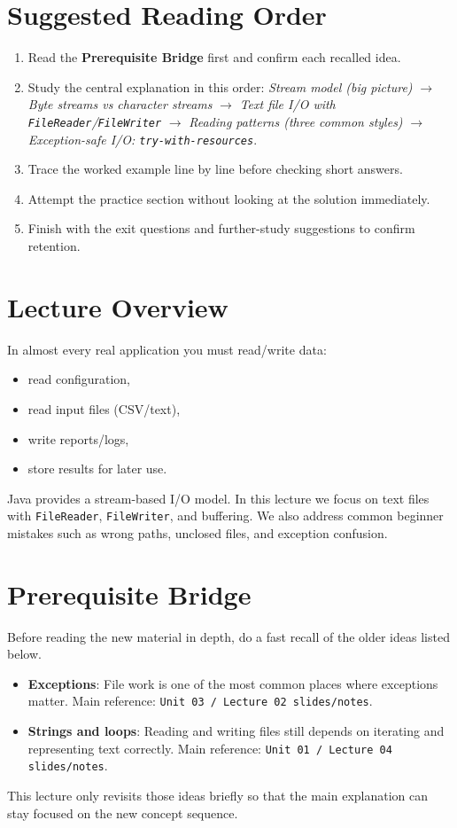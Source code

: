 \documentclass[11pt]{article}
\begin{document}
\section{Suggested Reading Order}
\begin{enumerate}
  \item Read the \textbf{Prerequisite Bridge} first and confirm each recalled idea.
  \item Study the central explanation in this order: \textit{Stream model (big picture)} $\rightarrow$ \textit{Byte streams vs character streams} $\rightarrow$ \textit{Text file I/O with \texttt{FileReader}/\texttt{FileWriter}} $\rightarrow$ \textit{Reading patterns (three common styles)} $\rightarrow$ \textit{Exception-safe I/O: \texttt{try-with-resources}}.
  \item Trace the worked example line by line before checking short answers.
  \item Attempt the practice section without looking at the solution immediately.
  \item Finish with the exit questions and further-study suggestions to confirm retention.
\end{enumerate}
\notesources{\OOPSUnitIIISources}

\section{Lecture Overview}
In almost every real application you must read/write data:
\begin{itemize}
  \item read configuration,
  \item read input files (CSV/text),
  \item write reports/logs,
  \item store results for later use.
\end{itemize}
Java provides a stream-based I/O model. In this lecture we focus on text files with \texttt{FileReader}, \texttt{FileWriter}, and buffering. We also address common beginner mistakes such as wrong paths, unclosed files, and exception confusion.
\notesources{\OOPSUnitIIISources}

\section{Prerequisite Bridge}
Before reading the new material in depth, do a fast recall of the older ideas listed below.
\begin{itemize}
  \item \textbf{Exceptions}: File work is one of the most common places where exceptions matter. Main reference: \texttt{Unit 03 / Lecture 02 slides/notes}.
  \item \textbf{Strings and loops}: Reading and writing files still depends on iterating and representing text correctly. Main reference: \texttt{Unit 01 / Lecture 04 slides/notes}.
\end{itemize}
This lecture only revisits those ideas briefly so that the main explanation can stay focused on the new concept sequence.
\notesources{\OOPSUnitIIISources}
\end{document}
